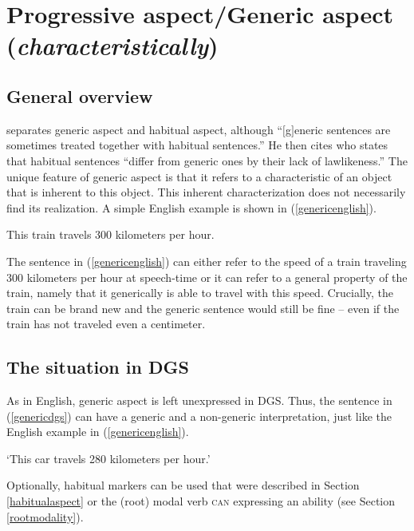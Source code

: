 \section{Progressive aspect/Generic aspect (\textit{characteristically})}\label{characteristic}
\subsection{General overview}
\citet[99]{cinque1999adverbs} separates generic aspect and habitual aspect, although ``$[$g$]$e\-ner\-ic sentences are sometimes treated together with habitual sentences.'' He then cites \citet[97]{dahl1985tense} who states that habitual sentences ``differ from generic ones by their lack of lawlikeness.'' The unique feature of generic aspect is that it refers to a characteristic of an object that is inherent to this object. This inherent characterization does not necessarily find its realization. A simple English example is shown in (\ref{genericenglish}).

\begin{exe}
\ex This train travels 300 kilometers per hour. \label{genericenglish}
\end{exe} 

\noindent The sentence in (\ref{genericenglish}) can either refer to the speed of a train traveling 300 kilometers per hour at speech-time or it can refer to a general property of the train, namely that it generically is able to travel with this speed. Crucially, the train can be brand new and the generic sentence would still be fine -- even if the train has not traveled even a centimeter. 

\subsection{The situation in DGS}
As in English, generic aspect is left unexpressed in DGS. Thus, the sentence in (\ref{genericdgs}) can have a generic and a non-generic interpretation, just like the English example in (\ref{genericenglish}).


\begin{exe}
\glt `This car travels 280 kilometers per hour.'\label{genericdgs}
\end{exe} 

\noindent Optionally, habitual markers can be used that were described in Section \ref{habitualaspect} or the (root) modal verb \textsc{can} expressing an ability (see Section \ref{rootmodality}).


